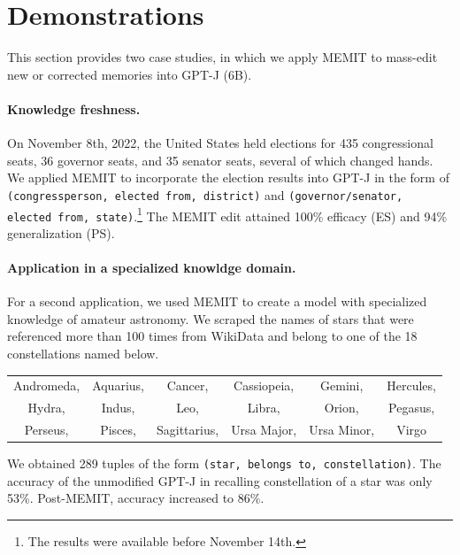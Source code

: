 \documentclass{article} %
\newcommand{\method}{MEMIT\xspace}
\newcommand{\iclrnew}[1]{#1}
\begin{document}
\iclrnew{%

\section{Demonstrations}

This section provides two case studies, in which we apply \method to mass-edit new or corrected memories into GPT-J (6B).

\paragraph{Knowledge freshness.} On November 8th, 2022, the United States held elections for 435 congressional seats, 36 governor seats, and 35 senator seats, several of which changed hands. We applied MEMIT to incorporate the election results into GPT-J in the form of \texttt{(congressperson, elected from, district)} and \texttt{(governor/senator, elected from, state)}.\footnote{The results were available before November 14th.} The \method edit attained 100\% efficacy (ES) and 94\% generalization (PS).


\paragraph{Application in a specialized knowldge domain.} For a second application, we used MEMIT to create a model with specialized knowledge of amateur astronomy. We scraped the names of stars that were referenced more than 100 times from WikiData and belong to one of the 18 constellations named below.

\begin{table}[h!]
    \centering
    \begin{tabular}{cccccc}
         Andromeda, &  Aquarius, & Cancer, & Cassiopeia, & Gemini, & Hercules,\\
         Hydra, &  Indus, & Leo, & Libra, & Orion, & Pegasus,\\
         Perseus, &  Pisces, & Sagittarius, & Ursa Major, & Ursa Minor, & Virgo\\
    \end{tabular}
\end{table}

We obtained 289 tuples of the form \texttt{(star, belongs to, constellation)}. The accuracy of the unmodified GPT-J in recalling constellation of a star was only 53\%. Post-MEMIT, accuracy increased to 86\%.




}
\end{document}
